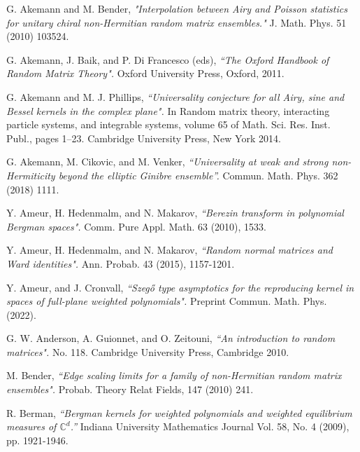 \documentclass[%
 jmp,
cp,  %
 amsmath,amsthm,amssymb,%
 reprint,%
onecolumn]{revtex4-2}
\begin{document}
{}
\begin{thebibliography}{1}



 G. Akemann and M. Bender, 
\emph{"Interpolation between Airy and Poisson statistics for unitary chiral non-Hermitian random matrix ensembles."}
 J. Math. Phys. 51 (2010) 103524.



G. Akemann, J. Baik, and P. Di Francesco (eds), \emph{``The Oxford Handbook of Random Matrix Theory".} Oxford University Press, Oxford, 2011.

 G. Akemann and M. J. Phillips,  
\emph{``Universality conjecture for all Airy, sine and Bessel kernels in the complex plane".}
In Random matrix theory, interacting particle systems, and integrable systems, volume 65 of Math.
Sci. Res. Inst. Publ., pages 1–23. Cambridge University Press, New York 2014.

 G. Akemann, M. Cikovic, and M. Venker,
\emph{``Universality at weak and strong non-Hermiticity beyond the elliptic Ginibre ensemble''.}
Commun. Math. Phys. 362 %
(2018) 1111.%

	 Y. Ameur, H. Hedenmalm,  and N. Makarov, 
    \emph{``Berezin transform in polynomial Bergman spaces".} 
     Comm. Pure Appl. Math. 63 (2010), 1533. 

    
     Y. Ameur, H. Hedenmalm,  and N. Makarov, 
    \emph{``Random normal matrices and Ward identities".} 
     Ann. Probab. 43 (2015), 1157-1201.


     Y. Ameur, and J. Cronvall, 
    \emph{``Szegő type asymptotics for the reproducing kernel in spaces of full-plane weighted polynomials".} Preprint 
    Commun. Math. Phys. (2022).
    
G. W. Anderson, A. Guionnet, and O. Zeitouni, \emph{``An introduction to random matrices".} No. 118. Cambridge University Press, Cambridge 2010.


      M. Bender,
     \emph{``Edge scaling limits for a family of non-Hermitian random matrix ensembles".}
     Probab. Theory Relat Fields, 147 (2010) 241. %
     
      R. Berman,
\emph{``Bergman kernels for weighted polynomials and weighted equilibrium measures of $\mathbb C^d$.''}
Indiana University Mathematics Journal
Vol. 58, No. 4 (2009), pp. 1921-1946.
     

\end{thebibliography}
\end{document}
